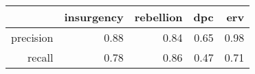 \begin{tabular}{rrrrr}
  \hline
 & insurgency & rebellion & dpc & erv \\ 
  \hline
precision & 0.88 & 0.84 & 0.65 & 0.98 \\ 
recall & 0.78 & 0.86 & 0.47 & 0.71 \\ 
   \hline
\end{tabular}